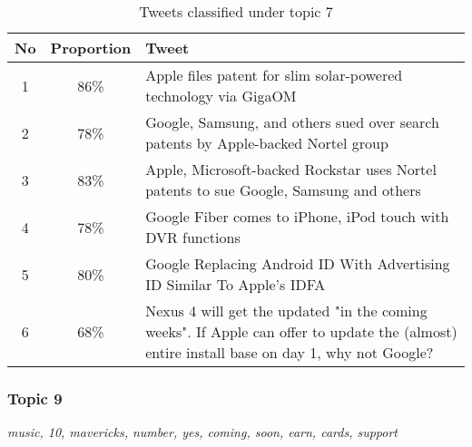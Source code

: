 \begin{table}[H]
  \begin{tabular}{c c p{13cm}} \toprule
    No & Proportion & Tweet \\ \midrule
    1  & 86\%       & Apple files patent for slim solar-powered technology via GigaOM \\ \midrule
    2  & 78\%       & Google, Samsung, and others sued over search patents by Apple-backed Nortel group \\ \midrule
    3  & 83\%       & Apple, Microsoft-backed Rockstar uses Nortel patents to sue Google, Samsung and others \\ \midrule
    4  & 78\%       & Google Fiber comes to iPhone, iPod touch with DVR functions \\ \midrule
    5  & 80\%       & Google Replacing Android ID With Advertising ID Similar To Apple's IDFA \\ \midrule
    6  & 68\%       & Nexus 4 will get the updated "in the coming weeks". If Apple can offer to
    update the (almost) entire install base on day 1, why not Google? \\ \bottomrule
  \end{tabular}
  \caption{Tweets classified under topic 7}
  \label{tab:tweets_under_7}
\end{table}



\subsubsection{Topic 9}
\label{sec:topic_9}
\textit{music, 10, mavericks, number, yes, coming, soon, earn, cards, support}\\\\

